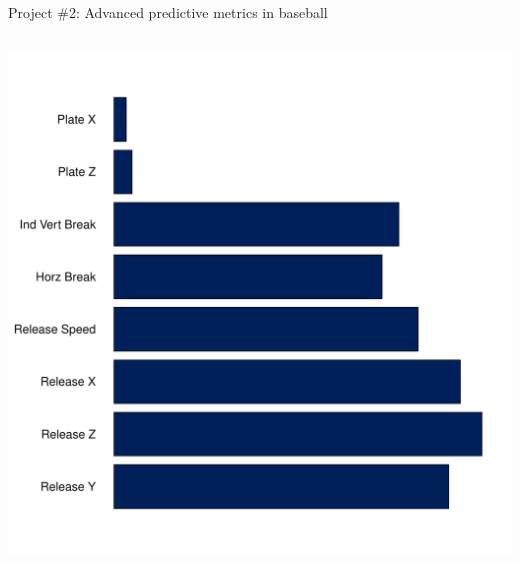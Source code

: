 \documentclass{beamer}
\begin{document}
\begin{frame}{Project \#2: Advanced predictive metrics in baseball}
\begin{columns}
\begin{column}{0.5\textwidth}
      \includegraphics[width = \textwidth]{images/feature_reliability.pdf}
    \end{column}
  \end{columns}
\end{frame}
\end{document}

